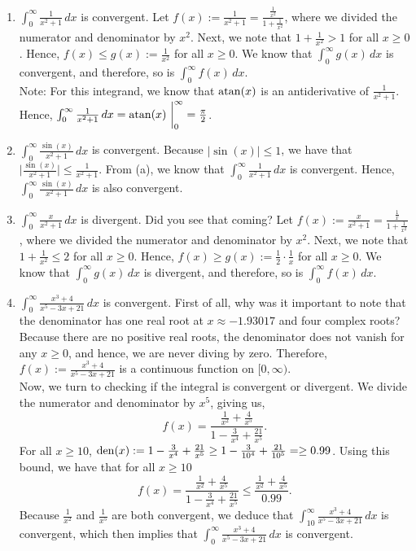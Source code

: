 \begin{enumerate}
\renewcommand{\labelenumi}{(\alph{enumi})}
\setlength{\itemsep}{.2cm}
    \item $\int_0^\infty \frac{1}{x^2 + 1} \, dx$ is convergent. Let $f(x) := \frac{1}{x^2 + 1} = \frac{\frac{1}{x^2}}{1 + \frac{1}{x^2}}$, where we divided the numerator and denominator by $x^2$. Next, we note that $1 + \frac{1}{x^2} > 1$ for all $x\ge 0$. Hence, $f(x) \le g(x) := \frac{1}{x^2}$ for all $x\ge 0$. We know that $ \int_0^\infty g(x) \, dx$ is convergent, and therefore, so is  $\int_0^\infty f(x) \, dx$.\\

    Note: For this integrand, we know that $\mathrm{atan}(x)$ is an antiderivative of  $\frac{1}{x^2 + 1}$. Hence, $\int_0^\infty \frac{1}{x^2 + 1} \, dx = \mathrm{atan}(x)~\bigg|_0^\infty =\frac{\pi}{2}$.

 \item $\int_0^\infty \frac{\sin(x)}{x^2 + 1} \, dx$ is convergent. Because $|\sin(x)| \le 1$, we have that $\bigg| \frac{\sin(x)}{x^2 + 1}\bigg| \le \frac{1}{x^2 + 1}$. From (a), we know that $\int_0^\infty \frac{1}{x^2 + 1} \, dx$ is convergent. Hence, $\int_0^\infty \frac{\sin(x)}{x^2 + 1} \, dx$ is also convergent.

 
\item $\int_0^\infty \frac{x}{x^2 + 1} \, dx$ is divergent. Did you see that coming? Let $f(x):=\frac{x}{x^2 + 1} =  \frac{\frac{1}{x}}{1 + \frac{1}{x^2}}$, where we divided the numerator and denominator by $x^2$. Next, we note that $1 + \frac{1}{x^2} \le 2$ for all $x\ge 0$.  Hence, $f(x) \ge g(x) := \frac{1}{2} \cdot \frac{1}{x}$ for all $x\ge 0$. We know that $ \int_0^\infty g(x) \, dx$ is divergent, and therefore, so is  $\int_0^\infty f(x) \, dx$.\\ 

\item $\int_0^\infty \frac{x^3 + 4}{x^5 - 3x +21} \, dx$ is convergent. First of all, why was it important to note that the denominator has one real root at $ x \approx -1.93017$ and four complex roots? Because there are no positive real roots, the denominator does not vanish for any $x \ge 0$, and hence, we are never diving by zero. Therefore, $f(x) := \frac{x^3 + 4}{x^5 - 3x +21}$ is a continuous function on $[0, \infty)$. \\

Now, we turn to checking if the integral is convergent or divergent. We divide the numerator and denominator by $x^5$, giving us, 
$$ f(x) = \frac{\frac{1}{x^2} + \frac{4}{x^5}}{1 - \frac{3}{x^4} + \frac{21}{x^5}}.$$
For all $x\ge 10$, ${\rm den}(x):= 1 - \frac{3}{x^4} + \frac{21}{x^5} \ge 1  - \frac{3}{10^4} + \frac{21}{10^5} =\ge 0.99$. Using this bound, we have that for all $x\ge 10$
$$f(x) = \frac{\frac{1}{x^2} + \frac{4}{x^5}}{1 - \frac{3}{x^4} + \frac{21}{x^5}} \le \frac{\frac{1}{x^2} + \frac{4}{x^5}}{0.99}.$$
Because $\frac{1}{x^2}$ and $\frac{1}{x^5}$ are both convergent, we deduce that  $\int_{10}^\infty \frac{x^3 + 4}{x^5 - 3x +21} \, dx$ is convergent, which then implies that $\int_0^\infty \frac{x^3 + 4}{x^5 - 3x +21} \, dx$ is convergent.


\end{enumerate}
